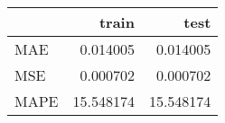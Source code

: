 \begin{tabular}{lrr}
\toprule
{} &      train &       test \\
\midrule
MAE  &   0.014005 &   0.014005 \\
MSE  &   0.000702 &   0.000702 \\
MAPE &  15.548174 &  15.548174 \\
\bottomrule
\end{tabular}
